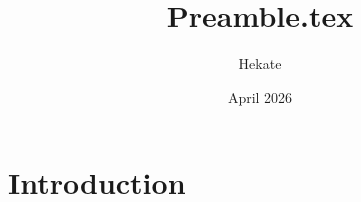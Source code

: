 \documentclass{article}
\title{Preamble.tex}
\author{Hekate }
\date{April 2026}
\begin{document}
\maketitle

\section{Introduction}
\end{document}
